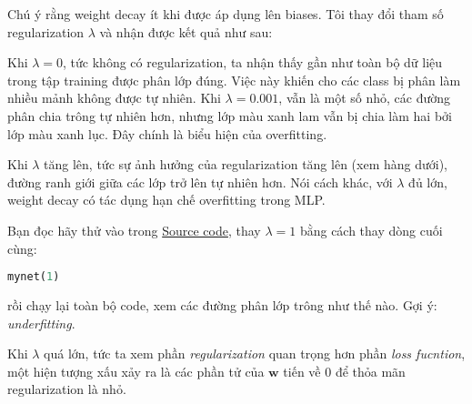 Chú ý rằng weight decay ít khi được áp dụng lên biases. Tôi thay đổi tham số regularization $\lambda$ và nhận được kết quả như sau: 
 
 
 
 
Khi $\lambda = 0$, tức không có regularization, ta nhận thấy gần như toàn bộ dữ liệu trong tập training được phân lớp đúng. Việc này khiến cho các class bị phân làm nhiều mảnh không được tự nhiên. Khi $\lambda = 0.001$, vẫn là một số nhỏ, các đường phân chia trông tự nhiên hơn, nhưng lớp màu xanh lam vẫn bị chia làm hai bởi lớp màu xanh lục. Đây chính là biểu hiện của overfitting. 
 
Khi $\lambda$ tăng lên, tức sự ảnh hưởng của regularization tăng lên (xem hàng dưới), đường ranh giới giữa các lớp trở lên tự nhiên hơn. Nói cách khác, với $\lambda$ đủ lớn, weight decay có tác dụng hạn chế overfitting trong MLP. 
 
Bạn đọc hãy thử vào trong \href{https://github.com/tiepvupsu/tiepvupsu.github.io/blob/master/assets/15_overfitting/Weight%20Decay.ipynb}{Source code}, thay $\lambda = 1$ bằng cách thay dòng cuối cùng: 
\begin{lstlisting}[language=Python]
mynet(1) 
\end{lstlisting}
rồi chạy lại toàn bộ code, xem các đường phân lớp trông như thế nào. Gợi ý: \textit{underfitting}. 
 
Khi $\lambda$ quá lớn, tức ta xem phần \textit{regularization} quan trọng hơn phần \textit{loss fucntion}, một hiện tượng xấu xảy ra là các phần tử của $\mathbf{w}$ tiến về 0 để thỏa mãn regularization là nhỏ. 
 
